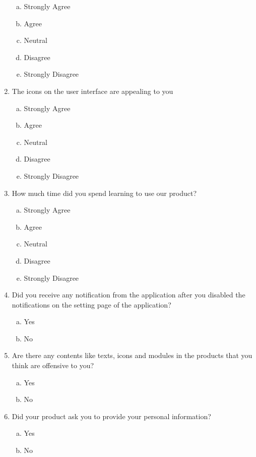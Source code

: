 \documentclass[12pt, titlepage]{article}
\begin{document}
\begin{enumerate}
        \begin{enumerate}[a.]
            \item Strongly Agree
            \item Agree
            \item Neutral
            \item Disagree
            \item Strongly Disagree
            \end{enumerate}
    \item The icons on the user interface are appealing to you
        \begin{enumerate}[a.]
            \item Strongly Agree
            \item Agree
            \item Neutral
            \item Disagree
            \item Strongly Disagree
            \end{enumerate}

    \item How much time did you spend learning to use our product?
        \begin{enumerate}[a.]
            \item Strongly Agree
            \item Agree
            \item Neutral
            \item Disagree
            \item Strongly Disagree
            \end{enumerate}

    \item Did you receive any notification from the application after you disabled the notifications on the setting page of the application?
        \begin{enumerate}[a.]
            \item Yes
            \item No
            \end{enumerate}

    \item Are there any contents like texts, icons and modules in the products that you think are offensive to you?
        \begin{enumerate}[a.]
            \item Yes
            \item No
            \end{enumerate}

    \item Did your product ask you to provide your personal information?
        \begin{enumerate}[a.]
            \item Yes
            \item No
            \end{enumerate}
\end{enumerate}
\end{document}
